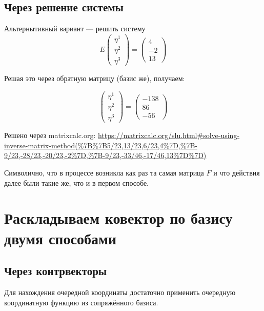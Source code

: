 \documentclass[12pt, a4paper]{article}
\begin{document}
    \subsection{Через решение системы}

    Альтернытивный вариант — решить систему \begin{equation}
        E\begin{pmatrix} \eta^1 \\ \eta^2 \\ \eta^3 \end{pmatrix} = \begin{pmatrix}4 \\ -2 \\ 13\end{pmatrix}
    \end{equation}

    Решая это через обратную матрицу (базис же), получаем:
    
    \begin{equation}
        \begin{pmatrix} \eta^1 \\ \eta^2 \\ \eta^3 \end{pmatrix} = \left(\begin{matrix}
            -138 \\
            86 \\
            -56
        \end{matrix}\right)
    \end{equation}

    Решено через matrixcalc.org:
    \url{https://matrixcalc.org/slu.html#solve-using-inverse-matrix-method(%7B%7B5/23,13/23,6/23,4%7D,%7B-9/23,-28/23,-20/23,-2%7D,%7B-9/23,-33/46,-17/46,13%7D%7D)}

    Символично, что в процессе возникла как раз та самая матрица $F$ и что действия далее были такие же, что и в первом способе.

\section{Раскладываем \textbf{ко}вектор по базису двумя способами}

    \subsection{Через контрвекторы}

    Для нахождения очередной координаты достаточно применить очередную координатную функцию из сопряжённого базиса.
\end{document}
